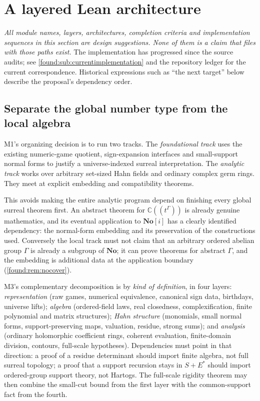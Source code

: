 \documentclass[11pt,letterpaper]{article}
\numberwithin{equation}{section}
\theoremstyle{definition}
\theoremstyle{remark}
\newcommand{\No}{\mathbf{No}}
\newcommand{\C}{\mathbb C}
\begin{document}
\section{A layered Lean architecture}
\label{found:sec:architecture}

\emph{All module names, layers, architectures, completion criteria and
implementation sequences in this section are design suggestions. None of them is
a claim that files with those paths exist.} The implementation has progressed
since the source audits; see \cref{found:sub:currentimplementation} and the
repository ledger for the current correspondence. Historical expressions such
as ``the next target'' below describe the proposal's dependency order.

\subsection{Separate the global number type from the local algebra}
\label{found:sub:twotracks}
M1's organizing decision is to run two tracks. The \emph{foundational track}
uses the existing numeric-game quotient, sign-expansion interfaces and
small-support normal forms to justify a universe-indexed surreal
interpretation. The \emph{analytic track} works over arbitrary set-sized Hahn
fields and ordinary complex germ rings. They meet at explicit embedding and
compatibility theorems.

This avoids making the entire analytic program depend on finishing every global
surreal theorem first. An abstract theorem for $\C((t^\Gamma))$ is already
genuine mathematics, and its eventual application to $\No[i]$ has a clearly
identified dependency: the normal-form embedding and its preservation of the
constructions used. Conversely the local track must not claim that an arbitrary
ordered abelian group $\Gamma$ is already a subgroup of $\No$; it can prove
theorems for abstract $\Gamma$, and the embedding is additional data at the
application boundary (\cref{found:rem:nocover}).

M3's complementary decomposition is by \emph{kind of definition}, in four
layers: \emph{representation} (raw games, numerical equivalence, canonical sign
data, birthdays, universe lifts); \emph{algebra} (ordered-field laws, real
closedness, complexification, finite polynomial and matrix structures);
\emph{Hahn structure} (monomials, small normal forms, support-preserving maps,
valuation, residue, strong sums); and \emph{analysis} (ordinary holomorphic
coefficient rings, coherent evaluation, finite-domain division, contours,
full-scale hypotheses). Dependencies must point in that direction: a proof of a
residue determinant should import finite algebra, not full surreal topology; a
proof that a support recursion stays in $S+E^*$ should import ordered-group
support theory, not Hartogs. The full-scale rigidity theorem may then combine
the small-cut bound from the first layer with the common-support fact from the
fourth.
\end{document}
